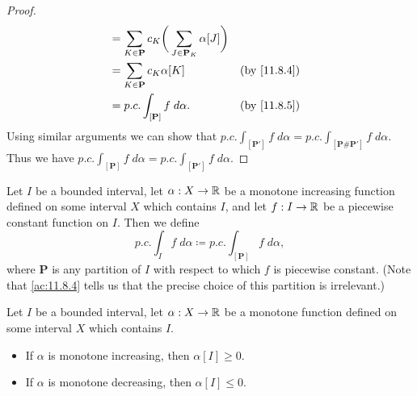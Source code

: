 \begin{proof}
\begin{align*}
                                                          & = \sum_{K \in \mathbf{P}} c_K \bigg(\sum_{J \in \mathbf{P}_K} \alpha[J]\bigg)                                                  \\
                                                          & = \sum_{K \in \mathbf{P}} c_K \alpha[K]                                       &                 & \text{(by \cref{11.8.4})}    \\
                                                          & = p.c. \int_{[\mathbf{P}]} f \; d \alpha.                                     &                 & \text{(by \cref{11.8.5})}
  \end{align*}
  Using similar arguments we can show that \(p.c. \int_{[\mathbf{P}']} f \; d \alpha = p.c. \int_{[\mathbf{P} \# \mathbf{P}']} f \; d \alpha\).
  Thus we have \(p.c. \int_{[\mathbf{P}]} f \; d \alpha = p.c. \int_{[\mathbf{P}']} f \; d \alpha\).
\end{proof}

\begin{ac}\label{ac:11.8.5}
  Let \(I\) be a bounded interval, let \(\alpha : X \to \mathbb{R}\) be a monotone increasing function defined on some interval \(X\) which contains \(I\), and let \(f : I \to \mathbb{R}\) be a piecewise constant function on \(I\).
  Then we define
  \[
    p.c. \int_I f \; d \alpha \coloneqq p.c. \int_{[\mathbf{P}]} f \; d \alpha,
  \]
  where \(\mathbf{P}\) is any partition of \(I\) with respect to which \(f\) is piecewise constant.
  (Note that \cref{ac:11.8.4} tells us that the precise choice of this partition is irrelevant.)
\end{ac}

\begin{ac}\label{ac:11.8.6}
  Let \(I\) be a bounded interval, let \(\alpha : X \to \mathbb{R}\) be a monotone function defined on some interval \(X\) which contains \(I\).
  \begin{itemize}
    \item If \(\alpha\) is monotone increasing, then \(\alpha[I] \geq 0\).
    \item If \(\alpha\) is monotone decreasing, then \(\alpha[I] \leq 0\).
  \end{itemize}
\end{ac}

